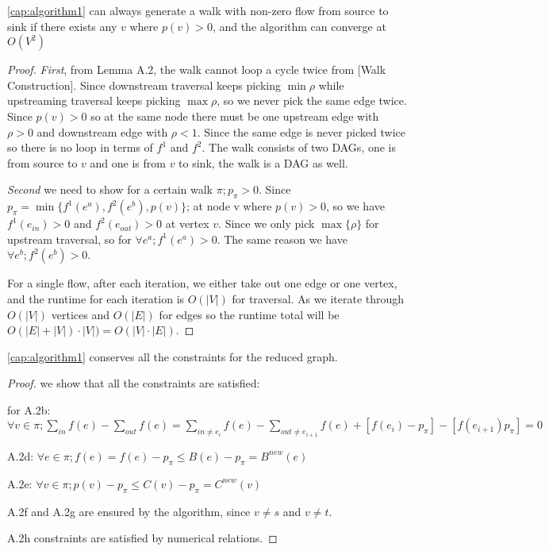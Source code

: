 \begin{lemma}   \autoref{cap:algorithm1} can always generate a walk with non-zero flow from source to sink if there exists any $v$ where $p(v) >0$, and the algorithm can converge at $O(V^2)$ \end{lemma}
\begin{proof}
\textit{First}, from Lemma A.2, the walk cannot loop a cycle twice from [Walk Construction]. Since downstream traversal keeps picking $\min \rho$ while upstreaming traversal keeps picking $\max \rho$, so we never pick the same edge twice. Since $p(v)>0$ so at the same node there must be one upstream edge with $\rho>0$ and downstream edge with $\rho<1$. Since the same edge is never picked twice so there is no loop in terms of $f^1$ and $f^2$. The walk consists of two DAGs, one is from source to $v$ and one is from $v$ to sink, the walk is a DAG as well.

\textit{Second} we need to show for a certain walk $\pi; p_\pi>0$. Since $p_\pi =  \min\{f^1(e^a), f^2(e^b), p(v)\}$; at node v where $p(v)>0$, so we have $f^1(e_{in})>0$ and $f^2(e_{out})>0$ at vertex $v$. Since we only pick $\max\{\rho\}$ for upstream traversal, so for $\forall e^a; f^1(e^a)>0$. The same reason we have $\forall e^b; f^2(e^b)>0$.

For a single flow, after each iteration, we either take out one edge or one vertex, and the runtime for each iteration is $O(|V|)$ for traversal. As we iterate through $O(|V|)$ vertices and $O(|E|)$ for edges so the runtime total will be $O(|E|+|V|)\cdot |V|) = O(|V|\cdot |E|)$.
\end{proof}


\begin{lemma}  \autoref{cap:algorithm1} conserves all the constraints for the reduced graph.
\end{lemma}
\begin{proof}
we show that all the constraints are satisfied:

for A.2b:
$\forall v \in \pi; \sum\limits_{in}  f(e) - \sum\limits_{out} f(e)=\sum\limits_{in \not=e_i}  f(e) - \sum\limits_{out\not=e_{i+1} } f(e) +[f(e_i)-p_\pi ] - [f(e_{i+1}) p_\pi] = 0 $

A.2d:
$\forall e \in \pi; f(e) = f(e)-p_\pi \leq B(e)-p_\pi=B^{new}(e)$ 

A.2e:
$\forall v \in \pi; p(v) - p_\pi \leq C(v) - p_\pi =C^{new}(v)$

A.2f and A.2g are ensured by the algorithm, since $v\not=s $ and $ v\not=t$.

A.2h constraints are satisfied by numerical relations.
\end{proof}

